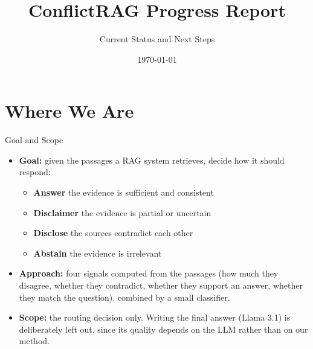 \documentclass[aspectratio=169]{beamer}
\title[Progress Report]{ConflictRAG Progress Report}
\subtitle{Current Status and Next Steps}
\author{}
\institute[HCMUT]{Computer Engineering \\ Ho Chi Minh City University of Technology (HCMUT)}
\date{\today}
\begin{document}
\maketitle

\section{Where We Are}

\begin{frame}{Goal and Scope}
  \begin{itemize}
    \item \textbf{Goal:} given the passages a RAG system retrieves, decide how it should respond:
      \begin{itemize}
        \item \textbf{Answer} \quad the evidence is sufficient and consistent
        \item \textbf{Disclaimer} \quad the evidence is partial or uncertain
        \item \textbf{Disclose} \quad the sources contradict each other
        \item \textbf{Abstain} \quad the evidence is irrelevant
      \end{itemize}
    \vspace{0.2cm}
    \item \textbf{Approach:} four signals computed from the passages (how much they disagree,
      whether they contradict, whether they support an answer, whether they match the question),
      combined by a small classifier.
    \vspace{0.2cm}
    \item \textbf{Scope:} the routing decision only. Writing the final answer (Llama 3.1) is
      deliberately left out, since its quality depends on the LLM rather than on our method.
  \end{itemize}
\end{frame}
\end{document}
